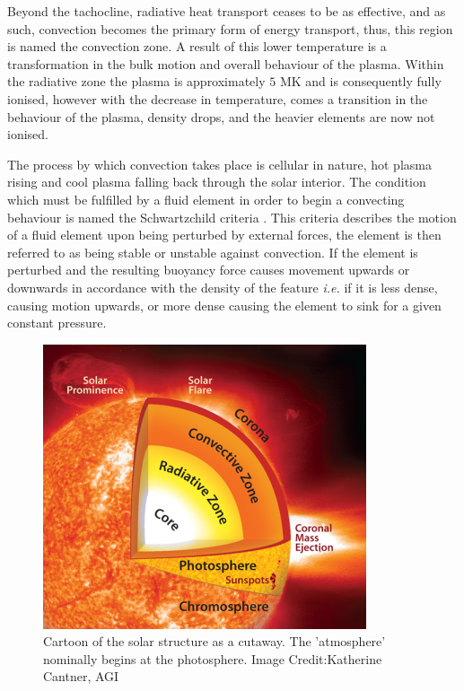 Beyond the tachocline, radiative heat transport ceases to be as effective, and as such, convection becomes the primary form of energy transport, thus, this region is named the convection zone. 
A result of this lower temperature is a transformation in the bulk motion and overall behaviour of the plasma.
Within the radiative zone the plasma is approximately $5$ MK and is consequently fully ionised, however with the decrease in temperature, comes a transition in the behaviour of the plasma, density drops, and the heavier elements are now not ionised.

The process by which convection takes place is cellular in nature, hot plasma rising and cool plasma falling back through the solar interior.
The condition which must be fulfilled by a fluid element in order to begin a convecting behaviour is named the Schwartzchild criteria \cite{Schwarzschild1958}.
This criteria describes the motion of a fluid element upon being perturbed by external forces, the element is then referred to as being stable or unstable against convection.
If the element is perturbed and the resulting buoyancy force causes movement upwards or downwards in accordance with the density of the feature \emph{i.e.} if it is less dense, causing motion upwards, or more dense causing the element to sink for a given constant pressure.

\begin{figure}
	\centering
	\includegraphics[width=\linewidth]{Chapter1/Figs/SolarStructure}
	\caption{Cartoon of the solar structure as a cutaway. The 'atmosphere' nominally begins at the photosphere. Image Credit:Katherine Cantner, AGI}
\end{figure}



